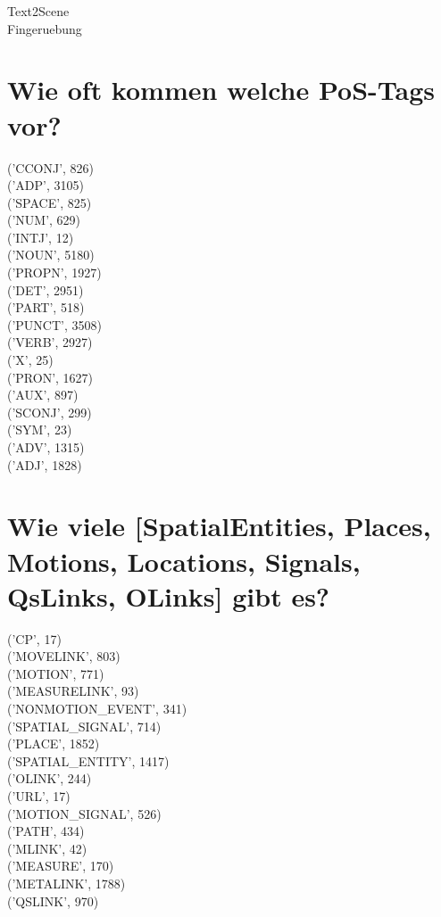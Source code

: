 \documentclass[12pt,fleqn]{article}
\begin{document}
 
\hrulefill
\vspace*{10mm} 
 
\begin{center}
	\Huge Text2Scene\\
	\onehalfspacing\LARGE Fingeruebung
\end{center}

\vspace*{10mm}
 
\section*{Wie oft kommen welche PoS-Tags vor?}
('CCONJ', 826)  \\
('ADP', 3105)	\\
('SPACE', 825)	\\
('NUM', 629)		\\
('INTJ', 12)		\\
('NOUN', 5180)	\\
('PROPN', 1927)	\\
('DET', 2951)	\\
('PART', 518)	\\
('PUNCT', 3508)	\\
('VERB', 2927)	\\
('X', 25)		\\
('PRON', 1627)	\\
('AUX', 897)		\\
('SCONJ', 299)	\\
('SYM', 23)		\\
('ADV', 1315)	\\
('ADJ', 1828)	\\

\section*{Wie viele [SpatialEntities, Places, Motions, Locations, Signals, QsLinks, OLinks] gibt es?}
('CP', 17)	\\
('MOVELINK', 803)	\\
('MOTION', 771)	\\
('MEASURELINK', 93)	\\
('NONMOTION\_EVENT', 341)	\\
('SPATIAL\_SIGNAL', 714)	\\
('PLACE', 1852)	\\
('SPATIAL\_ENTITY', 1417)	\\
('OLINK', 244)	\\
('URL', 17)	\\
('MOTION\_SIGNAL', 526)		\\
('PATH', 434)	\\
('MLINK', 42)	\\
('MEASURE', 170)	\\
('METALINK', 1788)	\\
('QSLINK', 970)	\\
\end{document}
